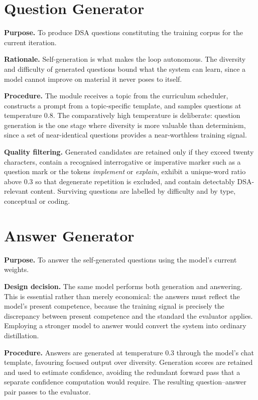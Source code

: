 \documentclass[12pt,a4paper]{report}
\begin{document}
\section{Question Generator}

\textbf{Purpose.} To produce DSA questions constituting the training corpus for the current iteration.

\textbf{Rationale.} Self-generation is what makes the loop autonomous. The diversity and difficulty of generated questions bound what the system can learn, since a model cannot improve on material it never poses to itself.

\textbf{Procedure.} The module receives a topic from the curriculum scheduler, constructs a prompt from a topic-specific template, and samples questions at temperature 0.8. The comparatively high temperature is deliberate: question generation is the one stage where diversity is more valuable than determinism, since a set of near-identical questions provides a near-worthless training signal.

\textbf{Quality filtering.} Generated candidates are retained only if they exceed twenty characters, contain a recognised interrogative or imperative marker such as a question mark or the tokens \textit{implement} or \textit{explain}, exhibit a unique-word ratio above 0.3 so that degenerate repetition is excluded, and contain detectably DSA-relevant content. Surviving questions are labelled by difficulty and by type, conceptual or coding.

\section{Answer Generator}

\textbf{Purpose.} To answer the self-generated questions using the model's current weights.

\textbf{Design decision.} The same model performs both generation and answering. This is essential rather than merely economical: the answers must reflect the model's present competence, because the training signal is precisely the discrepancy between present competence and the standard the evaluator applies. Employing a stronger model to answer would convert the system into ordinary distillation.

\textbf{Procedure.} Answers are generated at temperature 0.3 through the model's chat template, favouring focused output over diversity. Generation scores are retained and used to estimate confidence, avoiding the redundant forward pass that a separate confidence computation would require. The resulting question--answer pair passes to the evaluator.
\end{document}
